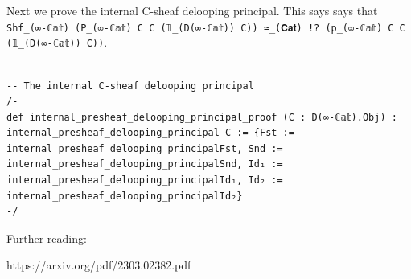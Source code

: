 \documentclass{book}
\theoremstyle{definition}
\newcounter{lcounter}
\begin{document}
{\begin{center}
\begin{tcolorbox}[width=5in,colback={white},title={\begin{center}\texttt{Lean \thelcounter} \addtocounter{lcounter}{1}  \end{center}},colbacktitle=Yellow,coltitle=black]
\begin{verbatim}
\end{verbatim}
\end{tcolorbox}
\end{center}

Next we prove the internal C-sheaf delooping principal. This says says that \texttt{Shf\_(∞-ℂ𝕒𝕥) (P\_(∞-ℂ𝕒𝕥) C C (𝟙\_(D(∞-ℂ𝕒𝕥)) C)) ≃\_(𝐂𝐚𝐭) !? (p\_(∞-ℂ𝕒𝕥) C C (𝟙\_(D(∞-ℂ𝕒𝕥)) C))}.\\

\begin{center}
\begin{tcolorbox}[width=5in,colback={white},title={\begin{center}\texttt{Lean \thelcounter} \addtocounter{lcounter}{1}  \end{center}},colbacktitle=Yellow,coltitle=black]
\begin{verbatim}

-- The internal C-sheaf delooping principal
/-
def internal_presheaf_delooping_principal_proof (C : D(∞-ℂ𝕒𝕥).Obj) : internal_presheaf_delooping_principal C := {Fst := internal_presheaf_delooping_principalFst, Snd := internal_presheaf_delooping_principalSnd, Id₁ := internal_presheaf_delooping_principalId₁, Id₂ := internal_presheaf_delooping_principalId₂}
-/

\end{verbatim}
\end{tcolorbox}
\end{center}
\fi




Further reading:

https://arxiv.org/pdf/2303.02382.pdf

\fi

}
\end{document}
